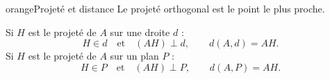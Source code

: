 \documentclass[11pt,a4paper]{article}
\begin{document}
\begin{landscape}
\begin{minipage}[t]{0.318\linewidth}
\begin{fichebox}{orange}{Projeté et distance}
Le projeté orthogonal est le point le plus proche.

Si $H$ est le projeté de $A$ sur une droite $d$ :
\[
H\in d \quad\text{et}\quad (AH)\perp d,
\qquad d(A,d)=AH.
\]
Si $H$ est le projeté de $A$ sur un plan $P$ :
\[
H\in P \quad\text{et}\quad (AH)\perp P,
\qquad d(A,P)=AH.
\]
\end{fichebox}

\end{minipage}
\end{landscape}

\restoregeometry
\pagestyle{fancy}
\nopagecolor
\color{black}
\clearpage
\end{document}
